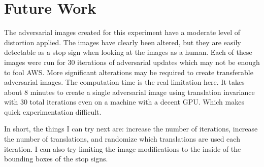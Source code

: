 \documentclass{article}
\begin{document}
\section{Future Work}

The adversarial images created for this experiment have a moderate level of distortion applied. The images have clearly been altered, but they are easily detectable as a stop sign when looking at the images as a human. Each of these images were run for 30 iterations of adversarial updates which may not be enough to fool AWS. More significant alterations may be required to create transferable adversarial images. The computation time is the real limitation here. It takes about 8 minutes to create a single adversarial image using translation invariance with 30 total iterations even on a machine with a decent GPU. Which makes quick experimentation difficult.

In short, the things I can try next are: increase the number of iterations, increase the number of translations, and randomize which translations are used each iteration. I can also try limiting the image modifications to the inside of the bounding boxes of the stop signs.

\clearpage


\end{document}
